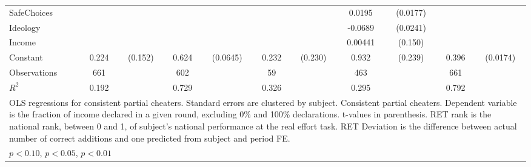 {\begin{tabular}{l*{5}{cc}}
SafeChoices     &                  &         &                  &         &                  &         &   0.0195         & (0.0177)&                  &         \\
Ideology        &                  &         &                  &         &                  &         &  -0.0689\sym{***}& (0.0241)&                  &         \\
Income          &                  &         &                  &         &                  &         &  0.00441         &  (0.150)&                  &         \\
Constant        &    0.224         &  (0.152)&    0.624\sym{***}& (0.0645)&    0.232         &  (0.230)&    0.932\sym{***}&  (0.239)&    0.396\sym{***}& (0.0174)\\
\hline
Observations    &      661         &         &      602         &         &       59         &         &      463         &         &      661         &         \\
\(R^{2}\)       &    0.192         &         &    0.729         &         &    0.326         &         &    0.295         &         &    0.792         &         \\
\hline\hline
\multicolumn{11}{p{19cm}}{\footnotesize OLS regressions for consistent partial cheaters. Standard errors are clustered by subject. Consistent partial cheaters. Dependent variable is the fraction of income declared in a given round, excluding 0\% and 100\% declarations. t-values in parenthesis. RET rank is the national rank, between 0 and 1, of subject's national performance at the real effort task. RET Deviation is the difference between actual number of correct additions and one predicted from subject and period FE.}\\
\multicolumn{11}{l}{\footnotesize \sym{*} \(p<0.10\), \sym{**} \(p<0.05\), \sym{***} \(p<0.01\)}\\
\end{tabular}
}
